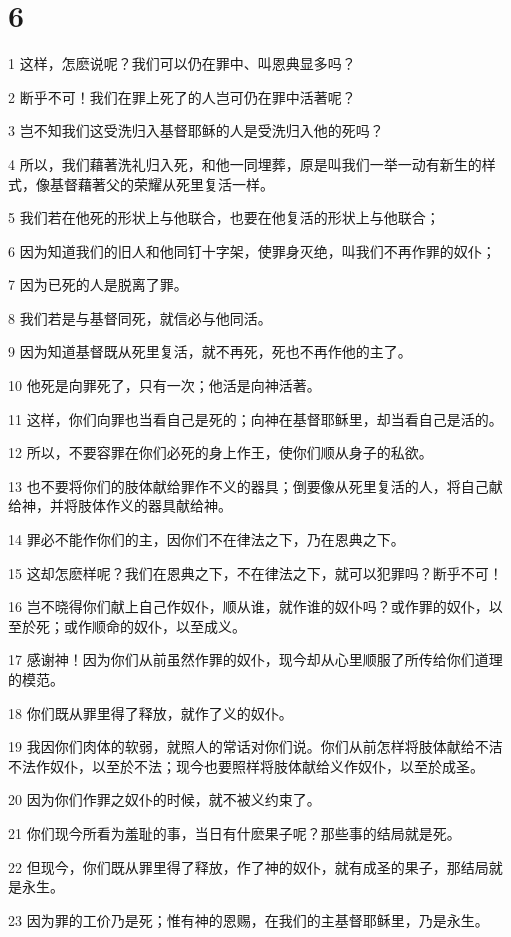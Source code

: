 \chapter{6}

\par 1 这样，怎麽说呢？我们可以仍在罪中、叫恩典显多吗？
\par 2 断乎不可！我们在罪上死了的人岂可仍在罪中活著呢？
\par 3 岂不知我们这受洗归入基督耶稣的人是受洗归入他的死吗？
\par 4 所以，我们藉著洗礼归入死，和他一同埋葬，原是叫我们一举一动有新生的样式，像基督藉著父的荣耀从死里复活一样。
\par 5 我们若在他死的形状上与他联合，也要在他复活的形状上与他联合；
\par 6 因为知道我们的旧人和他同钉十字架，使罪身灭绝，叫我们不再作罪的奴仆；
\par 7 因为已死的人是脱离了罪。
\par 8 我们若是与基督同死，就信必与他同活。
\par 9 因为知道基督既从死里复活，就不再死，死也不再作他的主了。
\par 10 他死是向罪死了，只有一次；他活是向神活著。
\par 11 这样，你们向罪也当看自己是死的；向神在基督耶稣里，却当看自己是活的。
\par 12 所以，不要容罪在你们必死的身上作王，使你们顺从身子的私欲。
\par 13 也不要将你们的肢体献给罪作不义的器具；倒要像从死里复活的人，将自己献给神，并将肢体作义的器具献给神。
\par 14 罪必不能作你们的主，因你们不在律法之下，乃在恩典之下。
\par 15 这却怎麽样呢？我们在恩典之下，不在律法之下，就可以犯罪吗？断乎不可！
\par 16 岂不晓得你们献上自己作奴仆，顺从谁，就作谁的奴仆吗？或作罪的奴仆，以至於死；或作顺命的奴仆，以至成义。
\par 17 感谢神！因为你们从前虽然作罪的奴仆，现今却从心里顺服了所传给你们道理的模范。
\par 18 你们既从罪里得了释放，就作了义的奴仆。
\par 19 我因你们肉体的软弱，就照人的常话对你们说。你们从前怎样将肢体献给不洁不法作奴仆，以至於不法；现今也要照样将肢体献给义作奴仆，以至於成圣。
\par 20 因为你们作罪之奴仆的时候，就不被义约束了。
\par 21 你们现今所看为羞耻的事，当日有什麽果子呢？那些事的结局就是死。
\par 22 但现今，你们既从罪里得了释放，作了神的奴仆，就有成圣的果子，那结局就是永生。
\par 23 因为罪的工价乃是死；惟有神的恩赐，在我们的主基督耶稣里，乃是永生。

